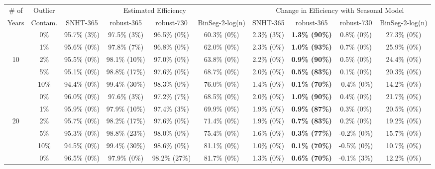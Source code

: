\documentclass[12pt]{article}
\begin{document}
\begin{landscape}

\begin{table}[ht]
\begin{footnotesize}
	\centering
	\begin{tabular}{cc|cccc|cccc}
		\hline
		\# of & Outlier & \multicolumn{4}{c}{Estimated Efficiency} & \multicolumn{4}{c}{Change in Efficiency with Seasonal Model} \\ 
		Years & Contam. & SNHT-365 & robust-365 & robust-730 & BinSeg-2-log(n) & SNHT-365 & robust-365 & robust-730 & BinSeg-2-log(n)\\ 
		\hline
		 & 0\% & 95.7\% (3\%) & 97.5\% (3\%) & 96.5\% (0\%) & 60.3\% (0\%) & 2.3\% (3\%) & \textbf{1.3\% (90\%)} & 0.8\% (0\%) & 27.3\% (0\%) \\ 
		 & 1\% & 95.6\% (0\%) & 97.8\% (7\%) & 96.8\% (0\%) & 62.0\% (0\%) & 2.3\% (0\%) & \textbf{1.0\% (93\%)} & 0.7\% (0\%) & 25.9\% (0\%) \\ 
		 10 & 2\% & 95.5\% (0\%) & 98.1\% (10\%) & 97.0\% (0\%) & 63.8\% (0\%) & 2.2\% (0\%) & \textbf{0.9\% (90\%)} & 0.5\% (0\%) & 24.4\% (0\%) \\ 
		 & 5\% & 95.1\% (0\%) & 98.8\% (17\%) & 97.6\% (0\%) & 68.7\% (0\%) & 2.0\% (0\%) & \textbf{0.5\% (83\%)} & 0.1\% (0\%) & 20.3\% (0\%) \\ 
		 & 10\% & 94.4\% (0\%) & 99.4\% (30\%) & 98.3\% (0\%) & 76.0\% (0\%) & 1.4\% (0\%) & \textbf{0.1\% (70\%)} & -0.4\% (0\%) & 14.2\% (0\%) \\ 
		 \hline
		 & 0\% & 96.0\% (0\%) & 97.6\% (3\%) & 97.2\% (7\%) & 68.5\% (0\%) & 2.0\% (0\%) & \textbf{1.0\% (90\%)} & 0.4\% (0\%) & 21.7\% (0\%) \\ 
		 & 1\% & 95.9\% (0\%) & 97.9\% (10\%) & 97.4\% (3\%) & 69.9\% (0\%) & 1.9\% (0\%) & \textbf{0.9\% (87\%)} & 0.3\% (0\%) & 20.5\% (0\%) \\ 
		 20 & 2\% & 95.7\% (0\%) & 98.2\% (17\%) & 97.6\% (0\%) & 71.4\% (0\%) & 1.9\% (0\%) & \textbf{0.7\% (83\%)} & 0.2\% (0\%) & 19.2\% (0\%) \\ 
		 & 5\% & 95.3\% (0\%) & 98.8\% (23\%) & 98.0\% (0\%) & 75.4\% (0\%) & 1.6\% (0\%) & \textbf{0.3\% (77\%)} & -0.2\% (0\%) & 15.7\% (0\%) \\ 
		 & 10\% & 94.5\% (0\%) & 99.4\% (30\%) & 98.6\% (0\%) & 81.1\% (0\%) & 1.0\% (0\%) & \textbf{0.1\% (70\%)} & -0.5\% (0\%) & 10.7\% (0\%) \\ 
		 \hline
		 & 0\% & 96.5\% (0\%) & 97.9\% (0\%) & 98.2\% (27\%) & 81.7\% (0\%) & 1.3\% (0\%) & \textbf{0.6\% (70\%)} & -0.1\% (3\%) & 12.2\% (0\%) \\ 

\end{tabular}
\end{footnotesize}
\end{table}
\end{landscape}
\end{document}
